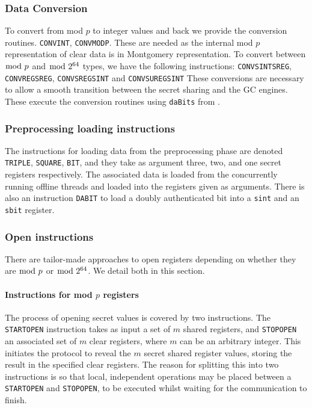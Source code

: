 \subsubsection{Data Conversion}
To convert from mod $p$ to integer values and
back we provide the conversion routines.
\verb+CONVINT+, \verb+CONVMODP+.
These are needed as the internal mod $p$ representation
of clear data is in Montgomery representation.
To convert between $\bmod \; p$ and $\bmod \; 2^{64}$ types, we have the following instructions:
\verb+CONVSINTSREG+, \verb+CONVREGSREG+, \verb+CONVSREGSINT+ and \verb+CONVSUREGSINT+
These conversions are necessary to allow a smooth transition between the secret sharing and the GC engines.
These execute the conversion routines using \verb+daBits+ from \cite{daBitPaper}.

\subsubsection{Preprocessing loading instructions}
The instructions for loading data from the preprocessing phase
are denoted \verb+TRIPLE+, \verb+SQUARE+, \verb+BIT+,
and they take as argument three, two, and one secret registers
respectively.
The associated data is loaded from the concurrently running
offline threads and loaded into the registers given as arguments.
There is also an instruction \verb+DABIT+ to load a doubly authenticated
bit into a \verb|sint| and an \verb|sbit| register.

\subsubsection{Open instructions}
There are tailor-made approaches to open registers depending on whether they are $\bmod \; p$ or $\bmod \; 2^{64}$. We detail both in this section.

\paragraph{Instructions for mod $p$ registers}
The process of opening secret values is covered by two instructions.
The \verb+STARTOPEN+ instruction takes as input a set of $m$
shared registers, and \verb+STOPOPEN+ an associated set of $m$
clear registers, where $m$ can be an arbitrary integer.
This initiates the protocol to reveal the $m$ secret shared register values,
storing the result in the specified clear registers. The reason for
splitting this into two instructions is so that local, independent
operations may be placed between a \verb+STARTOPEN+ and \verb+STOPOPEN+,
to be executed whilst waiting for the communication to finish.

